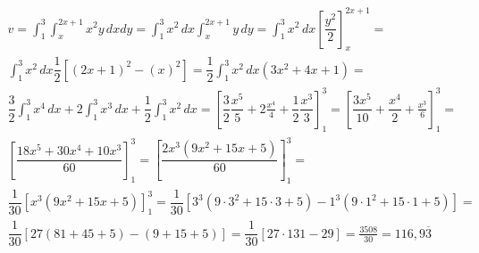 \begin{enumerate}
	\begin{align*}
		v = \int_1^3 \int_x^{2x + 1} x^2y\, dx dy = \int_1^3 x^2\, dx \int_x^{2x + 1} y\, dy =  \int_1^3 x^2\, dx \left[\dfrac{y^2}{2}\right]_x^{2x + 1} =\\  \int_1^3 x^2\, dx \dfrac{1}{2}\left[(2x + 1)^2 - (x)^2\right] = \dfrac{1}{2}\int_1^3 x^2\, dx \left(3x^2 + 4x + 1\right) =\\ \dfrac{3}{2}\int_1^3 x^4\, dx + 2\int_1^3 x^3\, dx + \dfrac{1}{2}\int_1^3 x^2\, dx = \left[\dfrac{3}{2}\dfrac{x^5}{5} + 2\frac{x^4}{4} + \dfrac{1}{2}\dfrac{x^3}{3}\right]_1^3 = \left[\dfrac{3x^5}{10} + \dfrac{x^4}{2} + \frac{x^3}{6}\right]_1^3 =\\ \left[\dfrac{18x^5 + 30x^4 + 10x^3}{60}\right]_1^3 = \left[\dfrac{2x^3\left(9x^2 + 15x + 5\right)}{60}\right]_1^3 =\\ \dfrac{1}{30}\left[x^3\left(9x^2 + 15x + 5\right)\right]_1^3 = \dfrac{1}{30}\left[3^3\left(9\cdot3^2 + 15\cdot3 + 5\right) - 1^3\left(9\cdot1^2 + 15\cdot1 + 5\right)\right] =\\ \dfrac{1}{30}\left[27(81 + 45 + 5) - (9 + 15 + 5)\right] = \dfrac{1}{30}\left[27\cdot131 - 29\right] = \frac{3508}{30} = 116,9\overline{3}	
	\end{align*}
\end{enumerate}